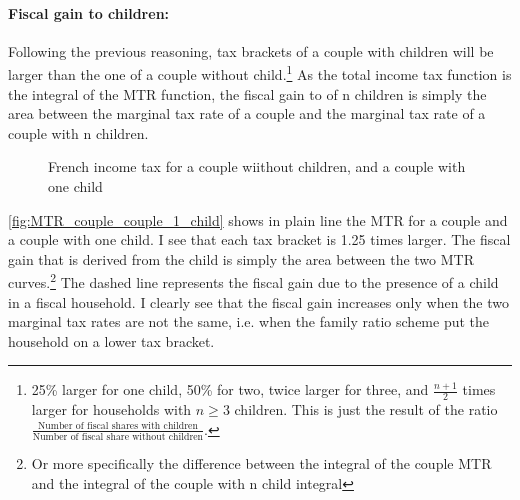   
\paragraph{Fiscal gain to children: } Following the previous reasoning, tax brackets of a couple with children will be larger than the one of a couple without child.\footnote{25\% larger for one child, 50\% for two, twice larger for three, and $\frac{n+1}{2}$ times larger for households with $n\geq 3$ children. This is just the result of the ratio $\frac{\text{Number of fiscal shares with children}}{\text{Number of fiscal share without children}}$.}
As the total income tax function is the integral of the MTR function, the fiscal gain to of n children is simply the area between the marginal tax rate of a couple and the marginal tax rate of a couple with n children.






\begin{figure}[H]
  \caption{French income tax for a couple wiithout children, and a couple with one child}
%
\label{fig:MTR_couple_couple_1_child}
\end{figure}

\autoref{fig:MTR_couple_couple_1_child} shows in plain line the MTR for a couple and a couple with one child. I see that each tax bracket is 1.25 times larger. The fiscal gain that is derived from the child is simply the area between the two MTR curves.\footnote{Or more specifically the difference between the integral of the couple MTR and the integral of the couple with n child integral}
The dashed line represents the fiscal gain due to the presence of a child in a fiscal household. I clearly see that the fiscal gain increases only when the two marginal tax rates are not the same, i.e. when the family ratio scheme put the household on a lower tax bracket.


